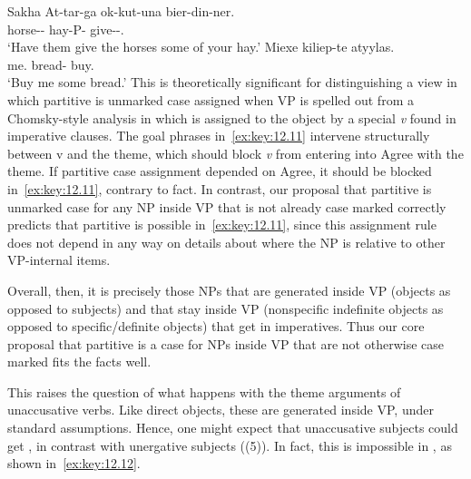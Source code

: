 \documentclass[output=paper]{langsci/langscibook}
\begin{document}
\ea\label{ex:key:12.11}Sakha
	\ea
		\gll At-tar-ga ok-kut-una bier-din-ner.\\
			horse-\Pl{}-\Dat{} hay-\Ssg{}P-\Part{} give-\Imp{}-\Tpl{}.\Sbj{}\\
		\glt ‘Have them give the horses some of your hay.’
	\ex
		\gll Miexe  kiliep-te atyylas.\\
			me.\Dat{}  bread-\Part{}  buy.\Imp{}\\
		\glt ‘Buy me some bread.’
	\z
\z
This is theoretically significant for distinguishing a view in which partitive
is unmarked case assigned when VP is spelled out from a Chomsky-style analysis
in which  is assigned to the object by a special \emph{v} found in
imperative clauses.  The goal phrases in~\eqref{ex:key:12.11} intervene structurally between v
and the theme, which should block \emph{v} from entering into Agree with the theme. If
partitive case assignment depended on Agree, it should be blocked in~\eqref{ex:key:12.11},
contrary to fact.  In contrast, our proposal that partitive is unmarked case
for any NP inside VP that is not already case marked correctly predicts that
partitive is possible in~\eqref{ex:key:12.11}, since this assignment rule does not depend in
any way on details about where the NP is relative to other VP-internal items.

Overall, then, it is precisely those NPs that are generated inside VP (objects
as opposed to subjects) and that stay inside VP (nonspecific indefinite objects
as opposed to specific/definite objects) that get  in
imperatives. Thus our core proposal that partitive is a case for NPs inside VP
that are not otherwise case marked fits the facts well.

This raises the question of what happens with the theme arguments of
unaccusative verbs.  Like direct objects, these are generated inside VP, under
standard assumptions.  Hence, one might expect that
unaccusative subjects could get , in
contrast with unergative subjects ((5)). In fact, this is
impossible in , as shown in~\eqref{ex:key:12.12}.
\end{document}

